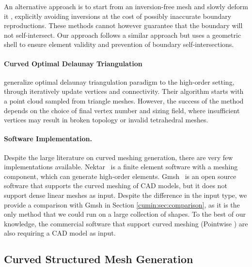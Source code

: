 An alternative approach is to start from an inversion-free mesh and slowly deform it \cite{Persson2009,RUIZGIRONES2017362}, explicitly avoiding inversions at the cost of possibly inaccurate boundary reproductions. These methods cannot however guarantee that the boundary will not self-intersect. Our approach follows a similar approach but uses a geometric shell to ensure element validity and prevention of boundary self-intersections.

\paragraph{Curved Optimal Delaunay Triangulation}
\cite{feng2018curved} generalize optimal delaunay triangulation paradigm to the high-order setting, through iteratively update vertices and connectivity.
Their algorithm starts with a point cloud sampled from triangle meshes. However, the success of the method depends on the choice of final vertex number and sizing field, where insufficient vertices may result in broken topology or invalid tetrahedral meshes.

\paragraph{Software Implementation.}
Despite the large literature on curve{d} meshing generation, there are very few implementations available. 
Nektar~\cite{moxeynekmesh} is a finite element software with a meshing component, which can generate high-order elements.
Gmsh~\cite{Geuzaine:2009:gmsh} is an open source software that supports the curved meshing of CAD models, but it does not support dense linear meshes as input. Despite the difference in the input type, we provide a comparison with Gmsh in Section \ref{cumin:sec:comparison}, as it is the only method that we could run on a large collection of shapes.
%
To the best of our knowledge, the commercial software that support curved meshing (Pointwise \cite{pointwise,Steve2016}) are also requiring a CAD model as input.



\subsection{Curved Structured Mesh Generation}

